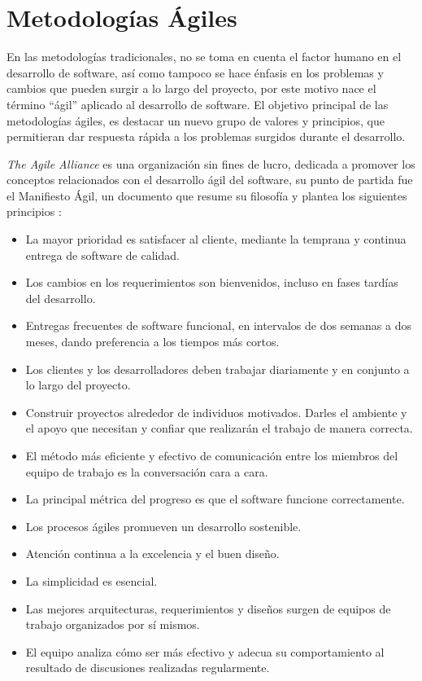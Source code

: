 \section{Metodologías Ágiles}
\par En las metodologías tradicionales, no se toma en cuenta el factor humano en el desarrollo de software, así como tampoco se hace énfasis en los problemas y cambios que pueden surgir a lo largo del proyecto, por este motivo nace el término ``ágil'' aplicado al desarrollo de software. El objetivo principal de las metodologías ágiles, es destacar un nuevo grupo de valores y principios, que permitieran dar respuesta rápida a los problemas surgidos durante el desarrollo. \\
\par \textit{The Agile Alliance} es una organización sin fines de lucro, dedicada a promover los conceptos relacionados con el desarrollo ágil del software, su punto de partida fue el Manifiesto Ágil, un documento que resume su filosofía y plantea los siguientes principios \cite{BOOK06,BOOK07}:
\begin{itemize}
    \item   La mayor prioridad es satisfacer al cliente, mediante la temprana y continua entrega de software de calidad.
    \item	Los cambios en los requerimientos son bienvenidos, incluso en fases tardías del desarrollo.
    \item	Entregas frecuentes de software funcional, en intervalos de dos semanas a dos meses, dando preferencia a los tiempos más cortos.
    \item	Los clientes y los desarrolladores deben trabajar diariamente y en conjunto a lo largo del proyecto.
    \item	Construir proyectos alrededor de individuos motivados. Darles el ambiente y el apoyo que necesitan y confiar que realizarán el trabajo de manera correcta.
    \item	El método más eficiente y efectivo de comunicación entre los miembros del equipo de trabajo es la conversación cara a cara.
    \item	La principal métrica del progreso es que el software funcione correctamente.
    \item	Los procesos ágiles promueven un desarrollo sostenible.
    \item	Atención continua a la excelencia y el buen diseño.
    \item	La simplicidad es esencial.
    \item	Las mejores arquitecturas, requerimientos y diseños surgen de equipos de trabajo organizados por sí mismos.
    \item	El equipo analiza cómo ser más efectivo y adecua su comportamiento al resultado de discusiones realizadas regularmente. 

\end{itemize}
